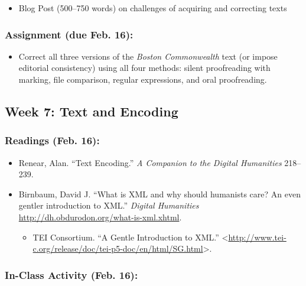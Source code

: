 \documentclass[]{article}
\begin{document}
\begin{itemize}
\itemsep1pt\parskip0pt
\item
  Blog Post (500--750 words) on challenges of acquiring and correcting
  texts
\end{itemize}

\subsubsection{Assignment (due Feb. 16):}\label{assignment-due-feb.-16}

\begin{itemize}
\itemsep1pt\parskip0pt
\item
  Correct all three versions of the \emph{Boston Commonwealth} text (or
  impose editorial consistency) using all four methods: silent
  proofreading with marking, file comparison, regular expressions, and
  oral proofreading.
\end{itemize}

\subsection{Week 7: Text and Encoding}\label{week-7-text-and-encoding}

\subsubsection{Readings (Feb. 16):}\label{readings-feb.-16}

\begin{itemize}
\itemsep1pt\parskip0pt
\item
  Renear, Alan. ``Text Encoding.'' \emph{A Companion to the Digital
  Humanities} 218--239.
\item
  Birnbaum, David J. ``What is XML and why should humanists care? An
  even gentler introduction to XML.'' \emph{Digital Humanities}
  \url{http://dh.obdurodon.org/what-is-xml.xhtml}.

  \begin{itemize}
  \itemsep1pt\parskip0pt
  \item
    TEI Consortium. ``A Gentle Introduction to XML.''
    \textless{}\url{http://www.tei-c.org/release/doc/tei-p5-doc/en/html/SG.html}\textgreater{}.
  \end{itemize}
\end{itemize}

\subsubsection{In-Class Activity (Feb.
16):}\label{in-class-activity-feb.-16}
\end{document}
